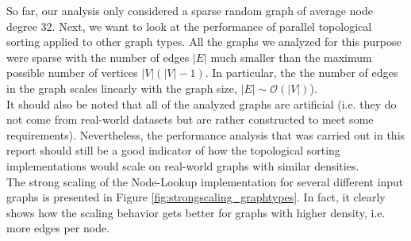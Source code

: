  So far, our analysis only considered a sparse random graph of average node degree 32.
Next, we want to look at the performance of parallel topological sorting applied to other graph types.
All the graphs we analyzed for this purpose were sparse with the number of edges $|E|$ much smaller than the maximum possible number of vertices $|V|(|V|-1)$.
In particular, the the number of edges in the graph scales linearly with the graph size, $|E| \sim \mathcal{O} ( |V| )$). \\
It should also be noted that all of the analyzed graphs are artificial (i.e. they do not come from real-world datasets but are rather constructed to meet some requirements).
Nevertheless, the performance analysis that was carried out in this report should still be a good indicator of how the topological sorting implementations would scale on real-world graphs with similar densities. \\
The strong scaling of the Node-Lookup implementation for several different input graphs is presented in Figure \ref{fig:strongscaling_graphtypes}.
In fact, it clearly shows how the scaling behavior gets better for graphs with higher density, i.e. more edges per node.
%
